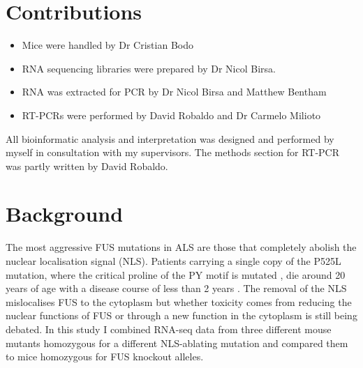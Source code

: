 \section{Contributions}
\begin{itemize}
	\item Mice were handled by Dr Cristian Bodo
	\item RNA sequencing libraries were prepared by Dr Nicol Birsa.
	\item RNA was extracted for PCR by Dr Nicol Birsa and Matthew Bentham
	\item RT-PCRs were performed by David Robaldo and Dr Carmelo Milioto
\end{itemize}
All bioinformatic analysis and interpretation was designed and performed by myself in consultation with my supervisors. 
The methods section for RT-PCR was partly written by David Robaldo.


\clearpage
\section{Background}

The most aggressive FUS mutations in ALS are those that completely abolish the nuclear localisation signal (NLS). 
Patients carrying a single copy of the P525L mutation, where the critical proline of the PY motif is mutated \citep{Chio2009}, die around 20 years of age with a disease course of less than 2 years \citep{Shang2016}.
The removal of the NLS mislocalises FUS to the cytoplasm but whether toxicity comes from reducing the nuclear functions of FUS or through a new function in the cytoplasm is still being debated.
In this study I combined RNA-seq data from three different mouse mutants homozygous for a different NLS-ablating mutation and compared them to mice homozygous for FUS knockout alleles. 

